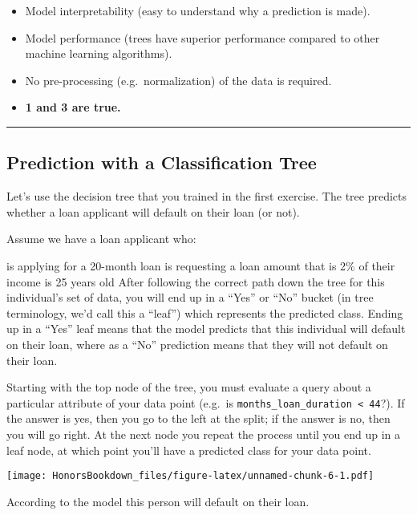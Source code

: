 \documentclass[
]{book}
\providecommand{\tightlist}{%
  \setlength{\itemsep}{0pt}\setlength{\parskip}{0pt}}
\begin{document}
\begin{itemize}
\tightlist
\item
  Model interpretability (easy to understand why a prediction is made).
\item
  Model performance (trees have superior performance compared to other machine learning algorithms).
\item
  No pre-processing (e.g.~normalization) of the data is required.
\item
  \textbf{1 and 3 are true.}
\end{itemize}

\begin{center}\rule{0.5\linewidth}{0.5pt}\end{center}

\hypertarget{prediction-with-a-classification-tree}{%
\subsection{Prediction with a Classification Tree}\label{prediction-with-a-classification-tree}}

Let's use the decision tree that you trained in the first exercise. The tree predicts whether a loan applicant will default on their loan (or not).

Assume we have a loan applicant who:

is applying for a 20-month loan
is requesting a loan amount that is 2\% of their income
is 25 years old
After following the correct path down the tree for this individual's set of data, you will end up in a ``Yes'' or ``No'' bucket (in tree terminology, we'd call this a ``leaf'') which represents the predicted class. Ending up in a ``Yes'' leaf means that the model predicts that this individual will default on their loan, where as a ``No'' prediction means that they will not default on their loan.

Starting with the top node of the tree, you must evaluate a query about a particular attribute of your data point (e.g.~is \texttt{months\_loan\_duration\ \textless{}\ 44}?). If the answer is yes, then you go to the left at the split; if the answer is no, then you will go right. At the next node you repeat the process until you end up in a leaf node, at which point you'll have a predicted class for your data point.

\texttt{[image: HonorsBookdown\_files/figure-latex/unnamed-chunk-6-1.pdf]}

According to the model this person will default on their loan.
\end{document}
